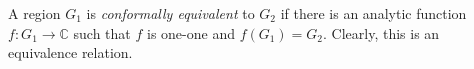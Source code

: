 A region $G_1$ is \textit{conformally equivalent} to $G_2$ if there is an analytic function $f: G_1 \rightarrow \mathbb{C}$ such that $f$ is one-one and $f(G_1) = G_2$. Clearly, this is an equivalence relation.
